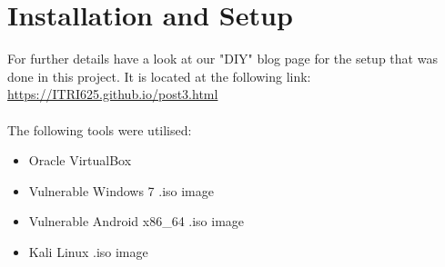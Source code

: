 \documentclass[a4paper, 12pt, titlepage]{report}
\begin{document}
\chapter{Installation and Setup}
For further details have a look at our "DIY" blog page for the setup that was done in this project. It is located at the following link:\\
\url{https://ITRI625.github.io/post3.html}\\\\
The following tools were utilised:
\begin{itemize}
    \item Oracle VirtualBox
    \item Vulnerable Windows 7 .iso image
    \item Vulnerable Android x86\_64 .iso image
    \item Kali Linux .iso image
\end{itemize}
\end{document}
